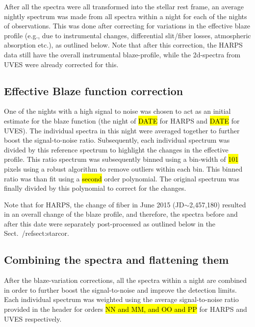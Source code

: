 \documentclass{aa}
\begin{document}
%
After all the spectra were all transformed into the stellar rest frame, an average nightly spectrum was made from all spectra within a night for each of the nights of observations. This was done after correcting for variations in the effective blaze profile (e.g., due to instrumental changes, differential slit/fiber losses, atmospheric absorption etc.), as outlined below. Note that after this correction, the HARPS data still have the overall instrumental blaze-profile, while the 2d-spectra from UVES were already corrected for this.


\subsection{Effective Blaze function correction}\label{sect:blaze}

One of the nights with a high signal to noise was chosen to act as an initial estimate for the blaze function (the night of \hl{DATE} for HARPS and \hl{DATE} for UVES). The individual spectra in this night were averaged together to further boost the signal-to-noise ratio. Subsequently, each individual spectrum was divided by this reference spectrum to highlight the changes in the effective profile. This ratio spectrum was subsequently binned using a bin-width of \hl{101} pixels using a robust algorithm to remove outliers within each bin. This binned ratio was than fit using a \hl{second} order polynomial. The original spectrum was finally divided by this polynomial to correct for the changes.

Note that for HARPS, the change of fiber in June 2015 (JD$\sim$2,457,180) resulted in an overall change of the blaze profile, and therefore, the spectra before and after this date were separately post-processed as outlined below in the Sect.~/ref{sect:starcor}.



\subsection{Combining the spectra and flattening them}\label{sect:comb}
After the blaze-variation corrections, all the spectra within a night are combined in order to further boost the signal-to-noise and improve the detection limits. Each individual spectrum was weighted using the average signal-to-noise ratio provided in the header for orders \hl{NN and MM, and OO and PP} for HARPS and UVES respectively.

%
%
%
%
\end{document}

